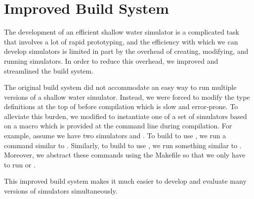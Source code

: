 \section{Improved Build System}\label{sec:build}
The development of an efficient shallow water simulator is a complicated task
that involves a lot of rapid prototyping, and the efficiency with which we can
develop simulators is limited in part by the overhead of creating, modifying,
and running simulators. In order to reduce this overhead, we improved and
streamlined the build system.

The original  build system did not accommodate an easy way to run
multiple versions of a shallow water simulator. Instead, we were forced to
modify the type definitions at the top of  before compilation
which is slow and error-prone. To alleviate this burden, we modified
 to instantiate one of a set of simulators based on a macro
which is provided at the command line during compilation. For example, assume
we have two simulators  and . To build  to
use , we run a command similar to . Similarly, to build  to use ,
we run something similar to .
Moreover, we abstract these commands using the Makefile so that we only have to
run  or .

This improved build system makes it much easier to develop and evaluate many
versions of simulators simultaneously.
